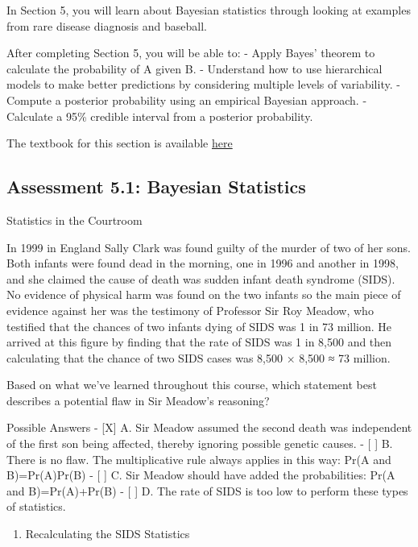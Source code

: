 \documentclass[
]{article}
\providecommand{\tightlist}{%
  \setlength{\itemsep}{0pt}\setlength{\parskip}{0pt}}
\begin{document}
In Section 5, you will learn about Bayesian statistics through looking
at examples from rare disease diagnosis and baseball.

After completing Section 5, you will be able to: - Apply Bayes' theorem
to calculate the probability of A given B. - Understand how to use
hierarchical models to make better predictions by considering multiple
levels of variability. - Compute a posterior probability using an
empirical Bayesian approach. - Calculate a 95\% credible interval from a
posterior probability.

The textbook for this section is available
\href{https://rafalab.github.io/dsbook/models.html\#bayesian-statistics}{here}

\hypertarget{assessment-5.1-bayesian-statistics}{%
\subsection{Assessment 5.1: Bayesian
Statistics}\label{assessment-5.1-bayesian-statistics}}

Statistics in the Courtroom

In 1999 in England Sally Clark was found guilty of the murder of two of
her sons. Both infants were found dead in the morning, one in 1996 and
another in 1998, and she claimed the cause of death was sudden infant
death syndrome (SIDS). No evidence of physical harm was found on the two
infants so the main piece of evidence against her was the testimony of
Professor Sir Roy Meadow, who testified that the chances of two infants
dying of SIDS was 1 in 73 million. He arrived at this figure by finding
that the rate of SIDS was 1 in 8,500 and then calculating that the
chance of two SIDS cases was 8,500 × 8,500 ≈ 73 million.

Based on what we've learned throughout this course, which statement best
describes a potential flaw in Sir Meadow's reasoning?

Possible Answers - {[}X{]} A. Sir Meadow assumed the second death was
independent of the first son being affected, thereby ignoring possible
genetic causes. - {[} {]} B. There is no flaw. The multiplicative rule
always applies in this way: Pr(A and B)=Pr(A)Pr(B) - {[} {]} C. Sir
Meadow should have added the probabilities: Pr(A and B)=Pr(A)+Pr(B) -
{[} {]} D. The rate of SIDS is too low to perform these types of
statistics.

\begin{enumerate}
\def\labelenumi{\arabic{enumi}.}
\setcounter{enumi}{1}
\tightlist
\item
  Recalculating the SIDS Statistics
\end{enumerate}
\end{document}
